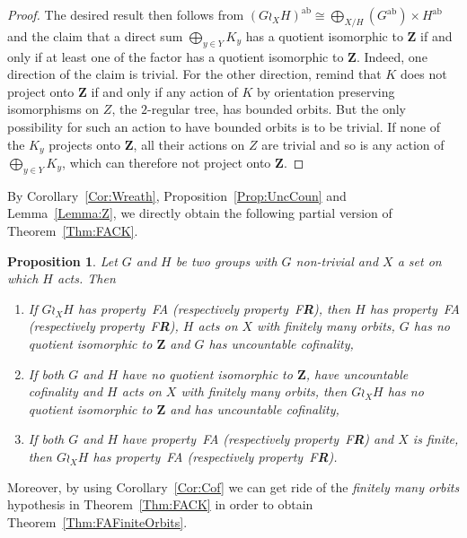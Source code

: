 \documentclass[a4paper]{article}
\newtheorem{prop}[lem]{Proposition}
\theoremstyle{definition}
\DeclareMathOperator\ab{ab}
\newcommand*{\field}[1]{\mathbf{#1}}
\newcommand*{\Z}{\field{Z}}
\newcommand*{\FA}{FA}
\newcommand*{\FR}{F\textbf{R}}
\begin{document}
\begin{proof}
The desired result then follows from $(G\wr_XH)^{\ab}\cong \bigoplus_{X/H}(G^{\ab})\times H^{\ab}$ and the claim that a direct sum $\bigoplus_{y\in Y}K_y$ has a quotient isomorphic to $\Z$ if and only if at least one of the factor has a quotient isomorphic to $\Z$.
Indeed, one direction of the claim is trivial.
For the other direction, remind that $K$ does not project onto $\Z$ if and only if any action of $K$ by orientation preserving isomorphisms on $Z$, the $2$-regular tree, has bounded orbits. But the only possibility for such an action to have bounded orbits is to be trivial.
If none of the $K_y$ projects onto $\Z$, all their actions on $Z$ are trivial and so is any action of $\bigoplus_{y\in Y}K_y$, which can therefore not project onto $\Z$.
\end{proof}
%
%
By Corollary~\ref{Cor:Wreath}, Proposition~\ref{Prop:UncCoun} and Lemma~\ref{Lemma:Z}, we directly obtain the following partial version of Theorem~\ref{Thm:FACK}.
%
%
\begin{prop}\label{Prop:WRFA}
Let $G$ and $H$ be two groups with $G$ non-trivial and $X$ a set on which $H$ acts.
Then
\begin{enumerate}
\item If $G\wr_XH$ has property~\FA{} (respectively property~\FR), then $H$ has property~\FA{} (respectively property~\FR), $H$ acts on $X$ with finitely many orbits, $G$ has no quotient isomorphic to $\Z$ and $G$ has uncountable cofinality,
\item If both $G$ and $H$ have no quotient isomorphic to $\Z$, have uncountable cofinality and $H$ acts on $X$ with finitely many orbits, then $G\wr_XH$ has no quotient isomorphic to $\Z$ and has uncountable cofinality,
\item If both $G$ and $H$ have property~\FA{} (respectively property~\FR) and $X$ is finite, then $G\wr_XH$ has property~FA (respectively property~\FR).
\end{enumerate}
\end{prop}
%
%
Moreover, by using Corollary~\ref{Cor:Cof} we can get ride of the \emph{finitely many orbits} hypothesis in Theorem~\ref{Thm:FACK} in order to obtain Theorem~\ref{Thm:FAFiniteOrbits}.
\end{document}

